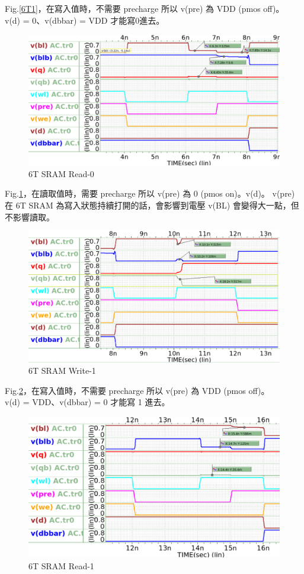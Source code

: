 \documentclass{article}
\begin{document}
Fig.\ref{6T1}，在寫入值時，不需要 precharge 所以 v(pre) 為 VDD (pmos off)。\\v(d) = 0、v(dbbar) = VDD 才能寫0進去。


\begin{figure}[H]
\centering
\includegraphics[width=0.7\linewidth]{./img/2023-11-16-10-05-30.png}
\caption{6T SRAM Read-0}
\label{6T2}
\end{figure}

Fig.\ref{6T2}，在讀取值時，需要 precharge 所以 v(pre) 為 0 (pmos on)。v(d)。 v(pre) 在 6T SRAM 為寫入狀態持續打開的話，會影響到電壓 v(BL) 會變得大一點，但不影響讀取。

\begin{figure}[H]
\centering
\includegraphics[width=0.7\linewidth]{./img/2023-11-16-10-06-40.png}
\caption{6T SRAM Write-1}
\label{6T3}
\end{figure}

Fig.\ref{6T3}，在寫入值時，不需要 precharge 所以 v(pre) 為 VDD (pmos off)。\\v(d) = VDD、v(dbbar) = 0 才能寫 1 進去。

\begin{figure}[H]
\centering
\includegraphics[width=0.7\linewidth]{./img/2023-11-16-10-08-04.png}
\caption{6T SRAM Read-1}
\label{6T4}
\end{figure}
\end{document}
